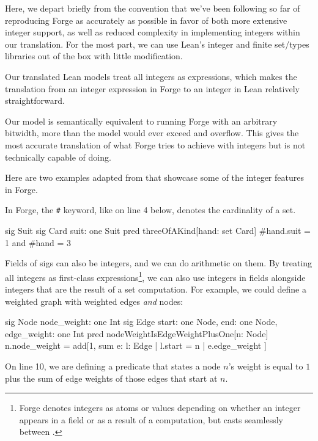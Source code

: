 Here, we depart briefly from the convention that we've been following so far of reproducing Forge as accurately as possible in favor of both more extensive integer support, as well as reduced complexity in implementing integers within our translation. For the most part, we can use Lean's integer and finite set/types libraries out of the box with little modification. 

Our translated Lean models treat all integers as expressions, which makes the translation from an integer expression in Forge to an integer in Lean relatively straightforward. 

Our model is semantically equivalent to running Forge with an arbitrary bitwidth, more than the model would ever exceed and overflow. This gives the most accurate translation of what Forge tries to achieve with integers but is not technically capable of doing. 

Here are two examples adapted from \cite{jackson2012software} that showcase some of the integer features in Forge. 

In Forge, the \texttt{\#} keyword, like on line 4 below, denotes the cardinality of a set. 

\begin{forge}
sig Suit {}
sig Card { suit: one Suit }
pred threeOfAKind[hand: set Card] {
  #hand.suit = 1 and #hand = 3
}
\end{forge}

Fields of sigs can also be integers, and we can do arithmetic on them. By treating all integers as first-class expressions\footnote{Forge denotes integers as atoms or values depending on whether an integer appears in a field or as a result of a computation, but casts seamlessly between \cite{forge-docs,nelson2024artifact}.}, we can also use integers in fields alongside integers that are the result of a set computation. For example, we could define a weighted graph with weighted edges \emph{and} nodes:

\begin{forge}
sig Node {
  node_weight: one Int
}
sig Edge {
  start: one Node,
  end: one Node,
  edge_weight: one Int
}
pred nodeWeightIsEdgeWeightPlusOne[n: Node] {
  n.node_weight = add[1, sum e: { l: Edge | l.start = n } | { e.edge_weight }]
}
\end{forge}

On line 10, we are defining a predicate that states a node $n$'s weight is equal to $1$ plus the sum of edge weights of those edges that start at $n$. 

